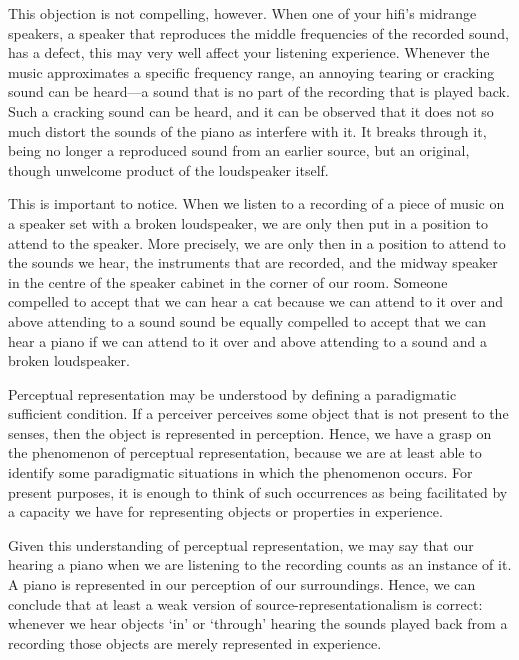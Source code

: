 \documentclass[sloppy, journal, git, bytitle, dodraft]{humapap}
\begin{document}
This objection is not compelling, however. When one of your hifi's midrange speakers, a speaker that reproduces the middle frequencies of the recorded sound, has a defect, this may very well affect your listening experience. Whenever the music approximates a specific frequency range, an annoying tearing or cracking sound can be heard---a sound that is no part of the recording that is played back. Such a cracking sound can be heard, and it can be observed that it does not so much distort the sounds of the piano as interfere with it. It breaks through it, being no longer a reproduced sound from an earlier source, but an original, though unwelcome product of the loudspeaker itself. 

This is important to notice. When we listen to a recording of a piece of music on a speaker set with a broken loudspeaker, we are only then put in a position to attend to the speaker. More precisely, we are only then in a position to attend to the sounds we hear, the instruments that are recorded, and the midway speaker in the centre of the speaker cabinet in the corner of our room. Someone compelled to accept that we can hear a cat because we can attend to it over and above attending to a sound sound be equally compelled to accept that we can hear a piano if we can attend to it over and above attending to a sound and a broken loudspeaker.


\sect Perceptual representation may be understood by defining a paradigmatic sufficient condition. If a perceiver perceives some object that is not present to the senses, then the object is represented in perception. Hence, we have a grasp on the phenomenon of perceptual representation, because we are at least able to identify some paradigmatic situations in which the phenomenon occurs. For present purposes, it is enough to think of such occurrences as being facilitated by a capacity we have for representing objects or properties in experience. 

Given this understanding of perceptual representation, we may say that our hearing a piano when we are listening to the recording counts as an instance of it. A piano is represented in our perception of our surroundings. Hence, we can conclude that at least a weak version of source-representationalism is correct: whenever we hear objects `in' or `through' hearing the sounds played back from a recording those objects are merely represented in experience. 
\end{document}
